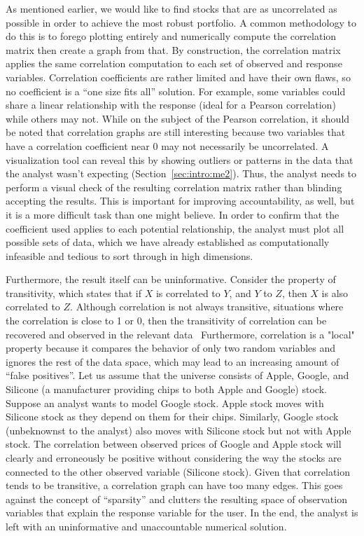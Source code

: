 As mentioned earlier, we would like to find stocks that are as uncorrelated as
possible in order to achieve the most robust portfolio. A common methodology to
do this is to forego plotting entirely and numerically compute the correlation
matrix then create a graph from that. By construction, the correlation matrix
applies the same correlation computation to each set of observed and response
variables. Correlation coefficients are rather limited and have their own flaws,
so no coefficient is a “one size fits all” solution. For example, some variables
could share a linear relationship with the response (ideal for a Pearson
correlation) while others may not. While on the subject of the Pearson
correlation, it should be noted that correlation graphs are still interesting
because two variables that have a correlation coefficient near 0 may not
necessarily be uncorrelated. A visualization tool can reveal this by showing
outliers or patterns in the data that the analyst wasn't expecting
(Section~\ref{sec:intro:me2}). Thus, the analyst needs to perform a visual check
of the resulting correlation matrix rather than blinding accepting the results.
This is important for improving accountability, as well, but it is a more
difficult task than one might believe. In order to confirm that the coefficient
used applies to each potential relationship, the analyst must plot all possible
sets of data, which we have already established as computationally infeasible
and tedious to sort through in high dimensions.

Furthermore, the result itself can be uninformative. Consider the property of
transitivity, which states that if $X$ is correlated to $Y$, and $Y$ to $Z$,
then $X$ is also correlated to $Z$. Although correlation is not always
transitive, situations where the correlation is close to 1 or 0, then the
transitivity of correlation can be recovered and observed in the relevant
data~\cite{tao2014} Furthermore, correlation is a "local" property because it
compares the behavior of only two random variables and ignores the rest of the
data space, which may lead to an increasing amount of ``false positives''. Let
us assume that the universe consists of Apple, Google, and Silicone (a
manufacturer providing chips to both Apple and Google) stock. Suppose an analyst
wants to model Google stock. Apple stock moves with Silicone stock as they
depend on them for their chips. Similarly, Google stock (unbeknownst to the
analyst) also moves with Silicone stock but not with Apple stock. The
correlation between observed prices of Google and Apple stock will clearly and
erroneously be positive without considering the way the stocks are connected to
the other observed variable (Silicone stock). Given that correlation tends to be
transitive, a correlation graph can have too many edges. This goes against the
concept of ``sparsity''  and clutters the resulting space of observation
variables that explain the response variable for the user. In the end, the
analyst is left with an uninformative and unaccountable numerical solution.

